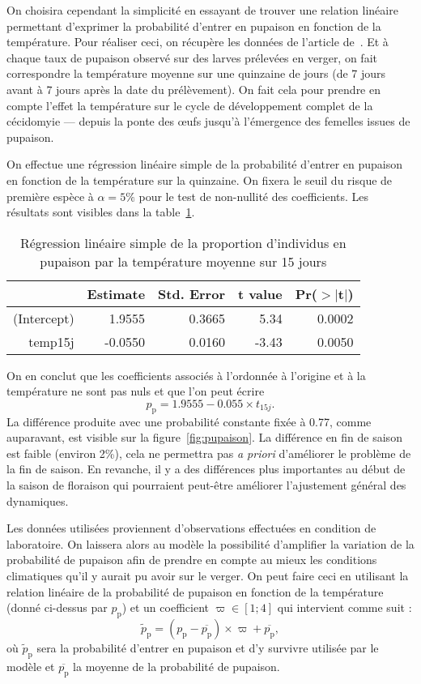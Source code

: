 On choisira cependant la simplicité en essayant de trouver une relation linéaire permettant d'exprimer la probabilité d'entrer en pupaison en fonction de la température.
Pour réaliser ceci, on récupère les données de l'article de~\citet{pauldiap}.
Et à chaque taux de pupaison observé sur des larves prélevées en verger, on fait correspondre la température moyenne sur une quinzaine de jours (de 7 jours avant à 7 jours après la date du prélèvement).
On fait cela pour prendre en compte l'effet la température sur le cycle de développement complet de la cécidomyie --- depuis la ponte des œufs jusqu'à l'émergence des femelles issues de pupaison.


On effectue une régression linéaire simple de la probabilité d'entrer en pupaison en fonction de la température sur la quinzaine.
On fixera le seuil du risque de première espèce à $\alpha = 5\%$ pour le test de non-nullité des coefficients.
Les résultats sont visibles dans la table~\ref{tab:lm2}.

\begin{table}[hb]
\centering
\caption{Régression linéaire simple de la proportion d'individus en pupaison par la température moyenne sur 15 jours}
\label{tab:lm2}
\begin{tabular}{rrrrr}
 & Estimate & Std. Error & t value & Pr($>$$|$t$|$) \\ 
  \hline
(Intercept) & 1.9555 & 0.3665 & 5.34 & 0.0002 \\ 
  temp15j & -0.0550 & 0.0160 & -3.43 & 0.0050 \\ 
\end{tabular}
\end{table}

On en conclut que les coefficients associés à l'ordonnée à l'origine et à la température ne sont pas nuls et que l'on peut écrire
\[
p_{\text{p}} = 1.9555 - 0.055\times t_{15j}.
\]
La différence produite avec une probabilité constante fixée à 0.77, comme auparavant, est visible sur la figure~\ref{fig:pupaison}.
La différence en fin de saison est faible (environ 2\%), cela ne permettra pas \emph{a priori} d'améliorer le problème de la fin de saison.
En revanche, il y a des différences plus importantes au début de la saison de floraison qui pourraient peut-être améliorer l'ajustement général des dynamiques.

Les données utilisées proviennent d'observations effectuées en condition de laboratoire.
On laissera alors au modèle la possibilité d'amplifier la variation de la probabilité de pupaison afin de prendre en compte au mieux les conditions climatiques qu'il y aurait pu avoir sur le verger.
On peut faire ceci en utilisant la relation linéaire de la probabilité de pupaison en fonction de la température (donné ci-dessus par $p_{\text{p}}$) et un coefficient $\varpi\in [1;4]$ qui intervient comme suit :
\[
\widetilde p_{\text{p}} = \left( p_{\text{p}} - \overline{p_{\text{p}}} \right) \times \varpi + \overline{p_{\text{p}}},
\]
où $\widetilde p_{\text{p}}$ sera la probabilité d'entrer en pupaison et d'y survivre utilisée par le modèle et $\overline{p_{\text{p}}}$ la moyenne de la probabilité de pupaison.

